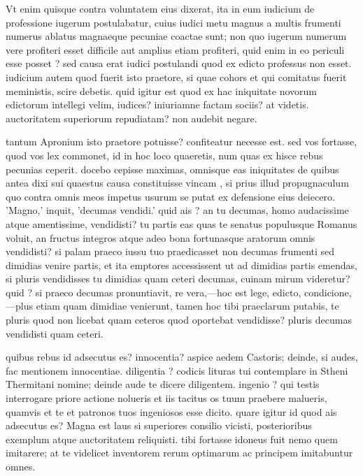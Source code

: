 Vt enim quisque contra voluntatem eius dixerat, ita in eum iudicium de professione iugerum postulabatur, cuius iudici metu magnus a multis frumenti numerus ablatus magnaeque pecuniae coactae sunt; non quo iugerum numerum vere profiteri esset difficile aut amplius etiam profiteri, quid enim in eo periculi esse posset ? sed causa erat iudici postulandi quod ex edicto professus non esset. iudicium autem quod fuerit isto praetore, si quae cohors et qui comitatus fuerit meministis, scire debetis. quid igitur est quod ex hac iniquitate novorum edictorum intellegi velim, iudices? iniuriamne factam sociis? at videtis. auctoritatem superiorum repudiatam? non audebit negare.

 tantum Apronium isto praetore potuisse? confiteatur necesse est. sed vos fortasse, quod vos lex commonet, id in hoc loco quaeretis, num quas ex hisce rebus pecunias ceperit. docebo cepisse maximas, omnisque eas iniquitates de quibus antea dixi sui quaestus causa constituisse vincam , si prius illud propugnaculum quo contra omnis meos impetus usurum se putat ex defensione eius deiecero. 'Magno,' inquit, 'decumas vendidi.' quid ais ? an tu decumas, homo audacissime atque amentissime, vendidisti? tu partis eas quas te senatus populusque Romanus voluit, an fructus integros atque adeo bona fortunasque aratorum omnis vendidisti? si palam praeco iussu tuo praedicasset non decumas frumenti sed dimidias venire partis, et ita emptores accessissent ut ad dimidias partis emendas, si pluris vendidisses tu dimidias quam ceteri decumas, cuinam mirum videretur? quid ? si praeco decumas pronuntiavit, re vera,—hoc est lege, edicto, condicione,—plus etiam quam dimidiae venierunt, tamen hoc tibi praeclarum putabis, te pluris quod non licebat quam ceteros quod oportebat vendidisse? pluris decumas vendidisti quam ceteri.

 quibus rebus id adsecutus es? innocentia? aspice aedem Castoris; deinde, si audes, fac mentionem innocentiae. diligentia ? codicis lituras tui contemplare in Stheni Thermitani nomine; deinde aude te dicere diligentem. ingenio ? qui testis interrogare priore actione nolueris et iis tacitus os tuum praebere malueris, quamvis et te et patronos tuos ingeniosos esse dicito. quare igitur id quod ais adsecutus es? Magna est laus si superiores consilio vicisti, posterioribus exemplum atque auctoritatem reliquisti. tibi fortasse idoneus fuit nemo quem imitarere; at te videlicet inventorem rerum optimarum ac principem imitabuntur omnes.

